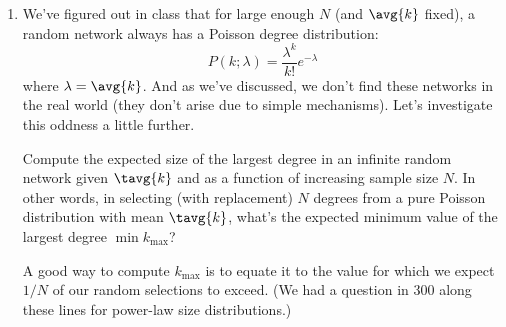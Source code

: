 \begin{enumerate}
  
   \solutionstart


   \solutionend


\item
  We've figured out in class that for large enough $N$ 
  (and $\avg{k}$ fixed),
  a random network always has a Poisson degree distribution:
  $$
  P(k;\lambda)
  =
  \frac{\lambda^{k}}
       {k!}
       e^{-\lambda}
       $$
       where $\lambda = \avg{k}$.
       And as we've discussed, we don't find these networks in the real world
       (they don't arise due to simple mechanisms).
       Let's investigate this oddness a little further.

       Compute the expected size of the largest degree 
       in an infinite random network given $\tavg{k}$ and as a function of 
       increasing sample size $N$.
       In other words, in selecting (with replacement) $N$ degrees from a
       pure Poisson distribution
       with mean $\tavg{k}$, what's the expected minimum value of the 
       largest degree $\min k_{\max}$?

       A good way to compute $k_{\max}$ is to equate
       it to the value for which we expect $1/N$ of our
       random selections to exceed.  (We had a question in 300
       along these lines for power-law size distributions.)


       
   \solutionstart


   \solutionend


   \solutionstart


\end{enumerate}
